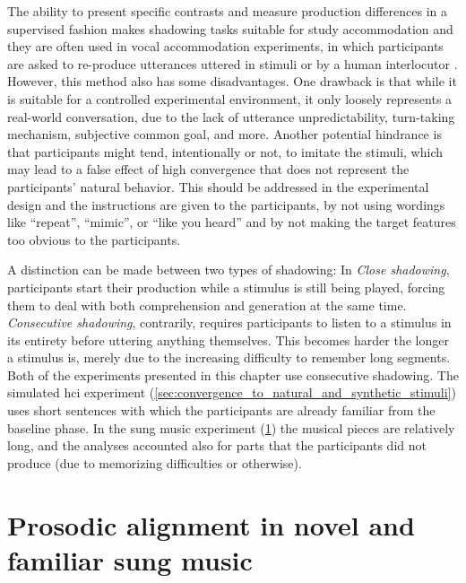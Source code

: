 The ability to present specific contrasts and measure production differences in a supervised fashion makes shadowing tasks suitable for study accommodation and they are often used in vocal accommodation experiments, in which participants are asked to re-produce utterances uttered in stimuli or by a human interlocutor \citep[e.g.,][]{Pardo2018comparison, Babel2014novelty, Shockley2004imitation, Walker2015repeat, Dias2016visibilivty, Dias2016visibilivty}.
However, this method also has some disadvantages.
One drawback is that while it is suitable for a controlled experimental environment, it only loosely represents a real-world conversation, due to the lack of utterance unpredictability, turn-taking mechanism, subjective common goal, and more.
Another potential hindrance is that participants might tend, intentionally or not, to imitate the stimuli, which may lead to a false effect of high convergence that does not represent the participants' natural behavior.
This should be addressed in the experimental design and the instructions are given to the participants, by not using wordings like \enquote{repeat}, \enquote{mimic}, or \enquote{like you heard} and by not making the target features too obvious to the participants.

A distinction can be made between two types of shadowing:
In \emph{Close shadowing}, participants start their production while a stimulus is still being played, forcing them to deal with both comprehension and generation at the same time.
\emph{Consecutive shadowing}, contrarily, requires participants to listen to a stimulus in its entirety before uttering anything themselves.
This becomes harder the longer a stimulus is, merely due to the increasing difficulty to remember long segments.
Both of the experiments presented in this chapter use consecutive shadowing.
The simulated \ac{hci} experiment (\cref{sec:convergence_to_natural_and_synthetic_stimuli}) uses short sentences with which the participants are already familiar from the baseline phase.
In the sung music experiment (\cref{sec:alignment_in_novel_and_familiar_sung_music}) the musical pieces are relatively long, and the analyses accounted also for parts that the participants did not produce (due to memorizing difficulties or otherwise).

\section{Prosodic alignment in novel and familiar sung music}
\label{sec:alignment_in_novel_and_familiar_sung_music}

